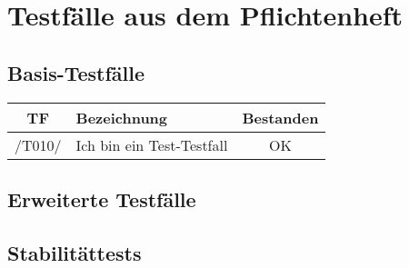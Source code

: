 \section{Testfälle aus dem Pflichtenheft}
\subsection{Basis-Testfälle}
\begin{center}
    \begin{tabular}[h]{|c|l|c|}
        \hline
        \textbf{TF} & \textbf{Bezeichnung} & \textbf{Bestanden} \\
        \hline
        /T010/ & Ich bin ein Test-Testfall & \cellcolor{green!25}OK \\
        \hline
    \end{tabular}
\end{center}

\subsection{Erweiterte Testfälle}
\subsection{Stabilitättests}